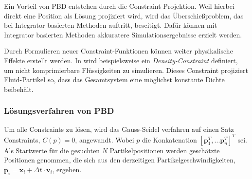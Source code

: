 Ein Vorteil von PBD entstehen durch die Constraint Projektion. 
Weil hierbei direkt eine Position als Lösung projiziert wird,
wird das Überschießproblem, das bei Integrator basierten Methoden 
auftritt, beseitigt. 
Dafür können mit Integrator basierten Methoden akkuratere Simulationsergebnisse erzielt werden.

Durch Formulieren neuer Constraint-Funktionen können weiter physikalische Effekte erstellt werden. In \cite{UPP} wird beispielsweise ein \textit{Density-Constraint} definiert, um nicht komprimierbare Flüssigkeiten zu simulieren. Dieses Constraint projiziert Fluid-Partikel so, dass das Gesamtsystem eine möglichst konstante Dichte beibehält.



\subsubsection{Lösungsverfahren von PBD}

Um alle Constraints zu lösen, wird das Gauss-Seidel verfahren auf einen Satz Constraints, $C(p)=0$, angewandt. Wobei $p$ die Konkatenation $[\textbf{p}_1^T,...\textbf{p}_n^T]^T$ sei.
Als Startwerte für die gesuchten $N$ Partikelpositionen werden geschätzte Positionen genommen, die sich aus den derzeitigen Partikelgeschwindigkeiten, $\textbf{p}_i = \textbf{x}_i + \Delta t \cdot \textbf{v}_i$, ergeben. 


